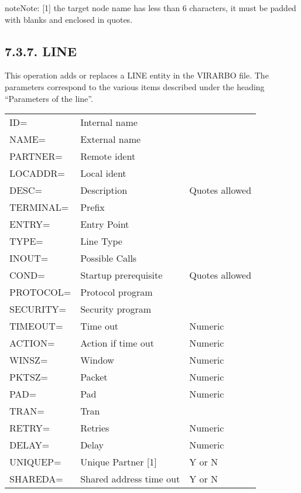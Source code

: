 \documentclass[letterpaper,10pt,english]{sphinxmanual}
\begin{document}
\begin{sphinxadmonition}{note}{Note:}
{[}1{]} the target node name has less than 6 characters, it must be padded with blanks and enclosed in quotes.
\end{sphinxadmonition}


\subsection{7.3.7. LINE}
\label{\detokenize{Installation_Guide:line}}
This operation adds or replaces a LINE entity in the VIRARBO file. The parameters correspond to the various items described under the heading “Parameters of the line”.


\begin{savenotes}\sphinxattablestart
\centering
\begin{tabulary}{\linewidth}[t]{|T|T|T|}
\hline
{}\relax &\relax &\relax \\
\hline
ID=
&
Internal name
&\\
\hline
NAME=
&
External name
&\\
\hline
PARTNER=
&
Remote ident
&\\
\hline
LOCADDR=
&
Local ident
&\\
\hline
DESC=
&
Description
&
Quotes allowed
\\
\hline
TERMINAL=
&
Prefix
&\\
\hline
ENTRY=
&
Entry Point
&\\
\hline
TYPE=
&
Line Type
&\\
\hline
INOUT=
&
Possible Calls
&\\
\hline
COND=
&
Startup
prerequisite
&
Quotes allowed
\\
\hline
PROTOCOL=
&
Protocol program
&\\
\hline
SECURITY=
&
Security program
&\\
\hline
TIMEOUT=
&
Time out
&
Numeric
\\
\hline
ACTION=
&
Action if
time out
&
Numeric
\\
\hline
WINSZ=
&
Window
&
Numeric
\\
\hline
PKTSZ=
&
Packet
&
Numeric
\\
\hline
PAD=
&
Pad
&
Numeric
\\
\hline
TRAN=
&
Tran
&\\
\hline
RETRY=
&
Retries
&
Numeric
\\
\hline
DELAY=
&
Delay
&
Numeric
\\
\hline
UNIQUEP=
&
Unique Partner {[}1{]}
&
Y or N
\\
\hline
SHAREDA=
&
Shared address
time out
&
Y or N
\\
\hline
\end{tabulary}
\par
\sphinxattableend\end{savenotes}
\end{document}
